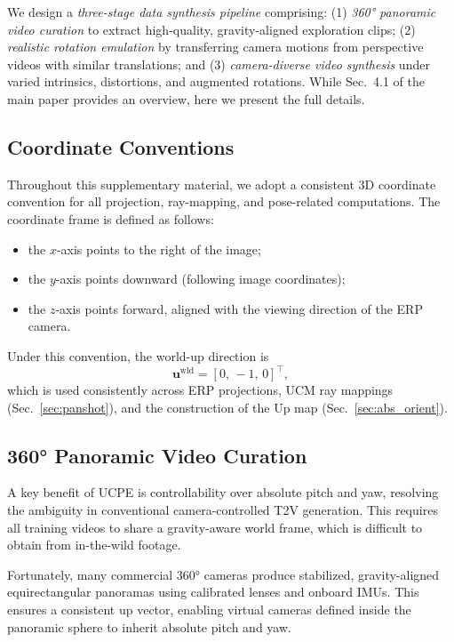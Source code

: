 We design a \emph{three-stage data synthesis pipeline} comprising:
(1) \emph{360° panoramic video curation} to extract high-quality, gravity-aligned exploration clips;
(2) \emph{realistic rotation emulation} by transferring camera motions from perspective videos with similar translations; and
(3) \emph{camera-diverse video synthesis} under varied intrinsics, distortions, and augmented rotations.  
While Sec.~4.1 of the main paper provides an overview, here we present the full details.

\subsection{Coordinate Conventions}
\label{sec:coord}

Throughout this supplementary material, we adopt a consistent 3D coordinate convention for all projection, ray-mapping, and pose-related computations.
The coordinate frame is defined as follows:
\begin{itemize}
    \item the \(x\)-axis points to the right of the image;
    \item the \(y\)-axis points downward (following image coordinates);
    \item the \(z\)-axis points forward, aligned with the viewing direction of the ERP camera.
\end{itemize}

Under this convention, the world-up direction is
\begin{equation}
\bm{u}^{\mathrm{wld}} = [0,\,-1,\,0]^\top,
\label{eq:world_up}
\end{equation}
which is used consistently across ERP projections, UCM ray mappings
(Sec.~\ref{sec:panshot}), and the construction of the Up map
(Sec.~\ref{sec:abs_orient}).

\subsection{360° Panoramic Video Curation}
\label{sec:panflow}


A key benefit of UCPE is controllability over absolute pitch and yaw, resolving the ambiguity in conventional camera-controlled T2V generation.  
This requires all training videos to share a gravity-aware world frame, which is difficult to obtain from in-the-wild footage.

Fortunately, many commercial 360° cameras produce stabilized, gravity-aligned equirectangular panoramas using calibrated lenses and onboard IMUs.
This ensures a consistent up vector, enabling virtual cameras defined inside the panoramic sphere to inherit absolute pitch and yaw.

